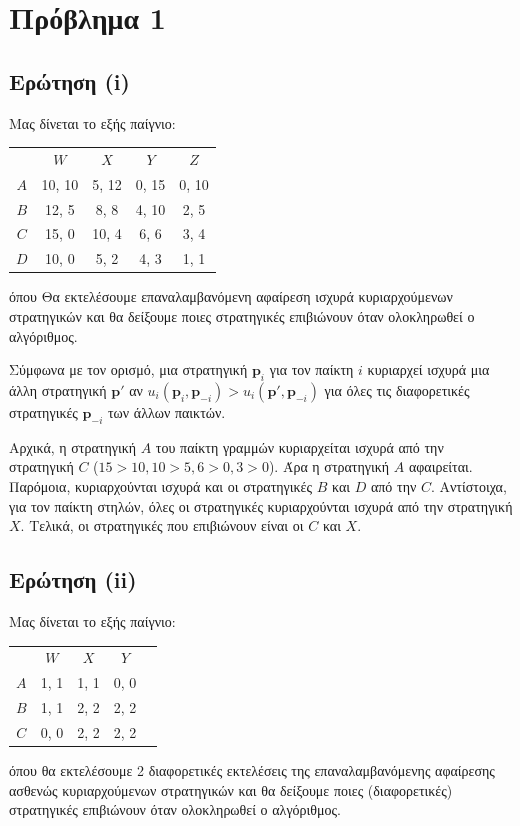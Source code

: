 \section{Πρόβλημα 1}

\subsection{Ερώτηση (i)}

Μας δίνεται το εξής παίγνιο:
\begin{center}
\begin{tabular}{ccccc}
        & $W$ & $X$ & $Y$ & $Z$ \\
    $A$ & 10, 10 & 5, 12 & 0, 15 & 0, 10 \\
    $B$ & 12, 5  & 8, 8  & 4, 10 & 2, 5  \\
    $C$ & 15, 0  & 10, 4 & 6, 6  & 3, 4  \\
    $D$ & 10, 0  & 5, 2  & 4, 3  & 1, 1  \\
\end{tabular}
\end{center}
όπου Θα εκτελέσουμε επαναλαμβανόμενη αφαίρεση ισχυρά κυριαρχούμενων στρατηγικών
και θα δείξουμε ποιες στρατηγικές επιβιώνουν όταν ολοκληρωθεί ο αλγόριθμος.

Σύμφωνα με τον ορισμό, μια στρατηγική $\textbf{p}_i$ για τον παίκτη $i$
κυριαρχεί ισχυρά μια άλλη στρατηγική $\textbf{p}'$ αν
$u_i(\textbf{p}_i, \textbf{p}_{-i}) > u_i(\textbf{p}', \textbf{p}_{-i})$ για
όλες τις διαφορετικές στρατηγικές $\textbf{p}_{-i}$ των άλλων παικτών.

Αρχικά, η στρατηγική $A$ του παίκτη γραμμών κυριαρχείται ισχυρά από την
στρατηγική $C$ ($15 > 10, 10 > 5, 6 > 0, 3 > 0$). Άρα η στρατηγική $A$
αφαιρείται. Παρόμοια, κυριαρχούνται ισχυρά και οι στρατηγικές $B$ και $D$ από την
$C$. Αντίστοιχα, για τον παίκτη στηλών, όλες οι στρατηγικές κυριαρχούνται ισχυρά
από την στρατηγική $X$. Τελικά, οι στρατηγικές που επιβιώνουν είναι οι $C$ και
$X$.

\subsection{Ερώτηση (ii)}

Μας δίνεται το εξής παίγνιο:
\begin{center}
\begin{tabular}{ccccc}
        & $W$  & $X$  & $Y$  \\
    $A$ & 1, 1 & 1, 1 & 0, 0 \\
    $B$ & 1, 1 & 2, 2 & 2, 2 \\
    $C$ & 0, 0 & 2, 2 & 2, 2 \\
\end{tabular}
\end{center}
όπου θα εκτελέσουμε 2 διαφορετικές εκτελέσεις της επαναλαμβανόμενης αφαίρεσης
ασθενώς κυριαρχούμενων στρατηγικών και θα δείξουμε ποιες (διαφορετικές)
στρατηγικές επιβιώνουν όταν ολοκληρωθεί ο αλγόριθμος.

